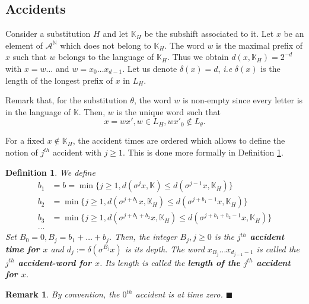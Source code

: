 \documentclass[11 pt]{article}
\newtheorem{definition}[proposition]{Definition}
\newtheorem{remark}[proposition]{Remark}
\def\K{{\mathbb K}}
\theoremstyle{definition}
\begin{document}
\subsection{Accidents}\label{sec:acc}
Consider a substitution $H$ and let $\mathbb K_H$ be the subshift associated to it.
Let $x$ be an element of $\mathcal{A}^\mathbb N$ which does not belong to $\mathbb K_H$. The word $w$ is the maximal prefix of $x$ such that $w$ belongs to the language of $\K_H$. 
Thus we obtain $d(x,\K_H)=2^{-d}$ with $x=w\dots$ and $w=x_0\dots x_{d-1}$. Let us denote $\delta(x)=d$, {\it i.e} $\delta(x)$ is the length of the longest prefix of $x$ in $L_H$. 

Remark that, for the substitution $\theta$, the word $w$ is non-empty since every letter is in the language of $\mathbb K$. Then, $w$ is the unique word such that 
$$x=wx', w\in L_{H}, wx'_{0}\notin L_{\theta}.$$

For a fixed $x\notin \mathbb K_H$, the accident times are ordered which allows to define the notion of $j^{th}$ accident with $j\ge 1$. This is done more formally in Definition  \ref{def:long-bisp-acc}.

\begin{definition}\label{def:long-bisp-acc}
We define
\begin{align*}
b_1&=b=\min\{j\geq 1, d(\sigma^jx,\mathbb K)\leq d(\sigma^{j-1}x,\K_H)\}\\
b_2&=\min\{j\geq 1, d(\sigma^{j+b_1}x,\mathbb K_H)\leq d(\sigma^{j+b_1-1}x,\K_H)\}\\
b_3&=\min\{j\geq 1, d(\sigma^{j+b_1+b_2}x,\mathbb K_H)\leq d(\sigma^{j+b_1+b_2-1}x,\K_H)\}\\
\dots
\end{align*}
Set $B_0=0, B_j=b_1+\dots +b_j$.
Then, the integer $B_j, j\geq 0$ is the {\bf $j^{th}$ accident time for $x$} and $d_{j}:=\delta(\sigma^{B_{j}}x)$ is its depth.  
The word $x_{B_j}\dots x_{d_{j-1}-1}$ is called  the {\bf $j^{th}$ accident-word for $x$}. Its length is called the {\bf length of the $j^{th}$ accident for $x$}.
\end{definition}

\begin{remark}
\label{rem-accident0}
By convention, the $0^{th}$ accident is at time zero. 
$\blacksquare$\end{remark}
\end{document}
